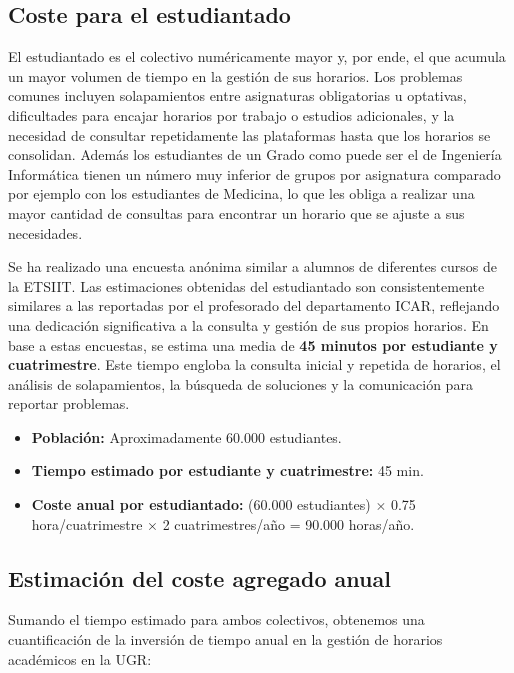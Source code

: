 \subsection{Coste para el estudiantado}

El estudiantado es el colectivo numéricamente mayor y, por ende, el que acumula un mayor volumen de tiempo en la gestión de sus horarios. Los problemas comunes incluyen solapamientos entre asignaturas obligatorias u optativas, dificultades para encajar horarios por trabajo o estudios adicionales, y la necesidad de consultar repetidamente las plataformas hasta que los horarios se consolidan. Además los estudiantes de un Grado como puede ser el de Ingeniería Informática tienen un número muy inferior de grupos por asignatura comparado por ejemplo con los estudiantes de Medicina, lo que les obliga a realizar una mayor cantidad de consultas para encontrar un horario que se ajuste a sus necesidades.\newline

Se ha realizado una encuesta anónima similar a alumnos de diferentes cursos de la ETSIIT. Las estimaciones obtenidas del estudiantado son consistentemente similares a las reportadas por el profesorado del departamento ICAR, reflejando una dedicación significativa a la consulta y gestión de sus propios horarios. En base a estas encuestas, se estima una media de \textbf{45 minutos por estudiante y cuatrimestre}. Este tiempo engloba la consulta inicial y repetida de horarios, el análisis de solapamientos, la búsqueda de soluciones y la comunicación para reportar problemas.

\begin{itemize}
    \item \textbf{Población:} Aproximadamente 60.000 estudiantes.
    \item \textbf{Tiempo estimado por estudiante y cuatrimestre:} 45 min.
    \item \textbf{Coste anual por estudiantado:} (60.000 estudiantes) $\times$ 0.75 hora/cuatrimestre $\times$ 2 cuatrimestres/año = 90.000 horas/año.
\end{itemize}

\subsection{Estimación del coste agregado anual}

Sumando el tiempo estimado para ambos colectivos, obtenemos una cuantificación de la inversión de tiempo anual en la gestión de horarios académicos en la UGR:

